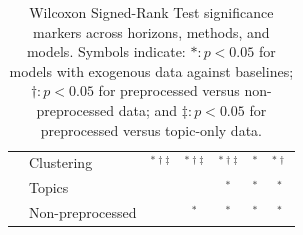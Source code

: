 \begin{table}[H]
{\begin{tabular}{llccccc}
 & Clustering & $^{*\dagger\ddagger}$ & $^{*\dagger\ddagger}$ & $^{*\dagger\ddagger}$ & $^{*}$ & $^{*\dagger}$ \\
 & Topics &  &  & $^{*}$ & $^{*}$ & $^{*}$ \\
 & Non-preprocessed &  & $^{*}$ & $^{*}$ & $^{*}$ & $^{*}$ \\
\bottomrule
\end{tabular}
} %
\vspace{5pt}
\caption{Wilcoxon Signed-Rank Test significance markers across horizons, methods, and models. Symbols indicate: $*: p < 0.05$ for models with exogenous data against baselines; $\dagger: p < 0.05$ for preprocessed versus non-preprocessed data; and $\ddagger: p < 0.05$ for preprocessed versus topic-only data.}
\label{tab:wilcoxon_significance}
\end{table}
